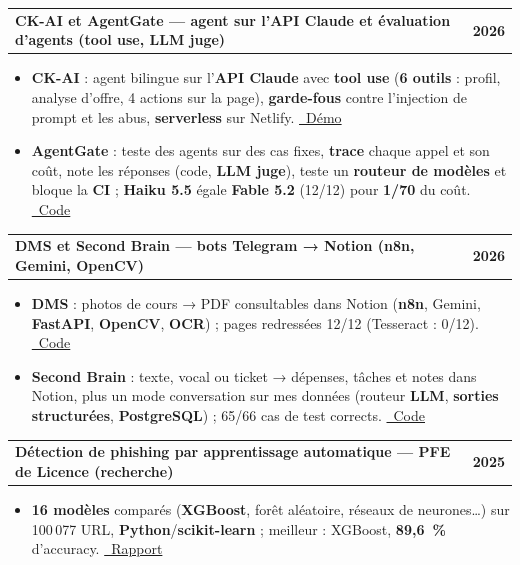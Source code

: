 \documentclass[a4paper,10pt]{article}
\makeatletter
\newenvironment{joblong}[2]
{\begin{tabularx}{\linewidth}{@{}X r@{}}\textbf{#1} & \textbf{#2}\\[2pt]\end{tabularx}\begin{itemize}}
{\end{itemize}}
\makeatother
\begin{document}
\begin{joblong}{CK-AI et AgentGate — agent sur l'API Claude et évaluation d'agents (tool use, LLM juge)}{2026}
\item \textbf{CK-AI} : agent bilingue sur l'\textbf{API Claude} avec \textbf{tool use} (\textbf{6 outils} : profil, analyse d'offre, 4 actions sur la page), \textbf{garde-fous} contre l'injection de prompt et les abus, \textbf{serverless} sur Netlify. \href{https://chemseddine-kebaily.netlify.app}{\faGlobe\ Démo}
\item \textbf{AgentGate} : teste des agents sur des cas fixes, \textbf{trace} chaque appel et son coût, note les réponses (code, \textbf{LLM juge}), teste un \textbf{routeur de modèles} et bloque la \textbf{CI} ; \textbf{Haiku 5.5} égale \textbf{Fable 5.2} (12/12) pour \textbf{1/70} du coût. \href{https://github.com/adkebaily/agentgate}{\faGithub\ Code}
\end{joblong}

\begin{joblong}{DMS et Second Brain — bots Telegram → Notion (n8n, Gemini, OpenCV)}{2026}
\item \textbf{DMS} : photos de cours → PDF consultables dans Notion (\textbf{n8n}, Gemini, \textbf{FastAPI}, \textbf{OpenCV}, \textbf{OCR}) ; pages redressées 12/12 (Tesseract : 0/12). \href{https://github.com/adkebaily/telegram-notion-dms}{\faGithub\ Code}
\item \textbf{Second Brain} : texte, vocal ou ticket → dépenses, tâches et notes dans Notion, plus un mode conversation sur mes données (routeur \textbf{LLM}, \textbf{sorties structurées}, \textbf{PostgreSQL}) ; 65/66 cas de test corrects. \href{https://github.com/adkebaily/second-brain-bot}{\faGithub\ Code}
\end{joblong}

\begin{joblong}{Détection de phishing par apprentissage automatique — PFE de Licence (recherche)}{2025}
\item \textbf{16 modèles} comparés (\textbf{XGBoost}, forêt aléatoire, réseaux de neurones…) sur 100\,077 URL, \textbf{Python}/\textbf{scikit-learn} ; meilleur : XGBoost, \textbf{89,6~\%} d'accuracy. \href{https://drive.google.com/file/d/1_rFw27PhBd6QnFyeZe5N6PHuoE_wE1JD/view}{\faFilePdf\ Rapport}
\end{joblong}

\end{document}
